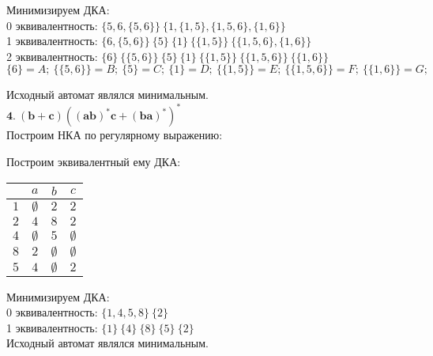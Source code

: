 \documentclass[12pt]{article}
\begin{document}
	Минимизируем ДКА: \\
	0 эквивалентность: $\{5,6,\{5,6\}\}\ \{1,\{1,5\},\{1,5,6\},\{1,6\}\}$ \\
	1 эквивалентность: $\{6,\{5,6\}\}\ \{5\}\ \{1\}\ \{\{1,5\}\}\ \{\{1,5,6\},\{1,6\}\}$ \\
	2 эквивалентность: $\{6\}\ \{\{5,6\}\}\ \{5\}\ \{1\}\ \{\{1,5\}\}\ \{\{1,5,6\}\}\ \{\{1,6\}\}$ \\
	$$\{6\}=A;\ \{\{5,6\}\}=B;\ \{5\}=C;\ \{1\}=D;\ \{\{1,5\}\}=E;\ \{\{1,5,6\}\}=F;\ \{\{1,6\}\}=G;$$
	
	Исходный автомат являлся минимальным. \\
	
	$\boldsymbol{4.\ (b+c)((ab)^*c+(ba)^*)^*}$ \\
	Построим НКА по регулярному выражению:
	\begin{center}
	\end{center}
	Построим эквивалентный ему ДКА:
		\begin{center}
		\begin{tabular}{|c|c|c|c|}
		\hline
		$\ $ & $a$ & $b$ & $c$ \\
		\hline
		$1$ & $\emptyset$ & $2$ & $2$ \\
		\hline
		$2$ & $4$ & $8$ & $2$ \\
		\hline
		$4$ & $\emptyset$ & $5$ & $\emptyset$ \\
		\hline
		$8$ & $2$ & $\emptyset$ & $\emptyset$ \\
		\hline
		$5$ & $4$ & $\emptyset$ & $2$\\
		\hline
		\end{tabular}
		
	\end{center}
	Минимизируем ДКА: \\
	0 эквивалентность: $\{1,4,5,8\}\ \{2\}$ \\
	1 эквивалентность: $\{1\}\ \{4\}\ \{8\}\ \{5\}\ \{2\}\ $ \\
	
	Исходный автомат являлся минимальным. \\
	
\end{document}
